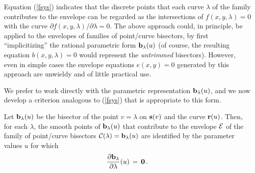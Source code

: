 Equation (\ref{fsys}) indicates that the discrete points that
each curve $\lambda$ of the family contributes to the envelope
can be regarded as the intersections of $f(x,y,\lambda)=0$ with
the curve $\partial f(x,y,\lambda)/\partial\lambda=0$. The above
approach could, in principle, be applied to the envelopes of
families of point/curve bisectors, by first ``implicitizing''
\cite{sederberg84} the rational parametric form ${\bf b}_\lambda
(u)$ (of course, the resulting equation $b(x,y,\lambda)=0$ would
represent the {\it untrimmed\/} bisectors). However, even in simple
cases the envelope equations $e(x,y)=0$ generated by this approach
are unwieldy and of little practical use.

We prefer to work directly with the parametric representation
${\bf b}_\lambda(u)$, and we now develop a criterion analogous
to (\ref{fsys}) that is appropriate to this form.

\newpage

\begin{thm}
Let ${\bf b}_\lambda(u)$ be the bisector of the point $v=\lambda$
on ${\bf s}(v)$ and the curve ${\bf r}(u)$. Then, for each $\lambda$,
the smooth points of ${\bf b}_\lambda(u)$ that
contribute to the envelope ${\cal E}$ of the family of point/curve
bisectors ${\cal C}(\lambda)={\bf b}_\lambda(u)$ are identified by
the parameter values $u$ for which
\begin{equation} \label{blambda}
{\partial{\bf b}_\lambda \over \partial\lambda}(u) \,=\, {\bf 0} \,.
\end{equation}
\end{thm}

